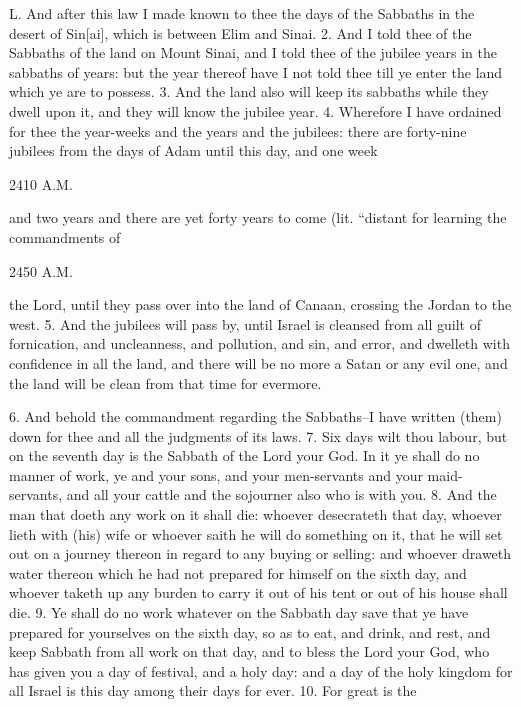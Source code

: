 
L. And after this law I made known to thee the days of the Sabbaths in the desert of Sin[ai], which is between Elim and Sinai.  2. And I told thee of the Sabbaths of the land on Mount Sinai, and I told thee of the jubilee years  in the sabbaths of years: but the year thereof have I not told thee till ye enter the land which ye are to possess. 3. And the land also will keep its sabbaths while they dwell upon it,  and they will know the jubilee year. 4. Wherefore I have ordained for thee the year-weeks  and the years and the jubilees: there are forty-nine jubilees from the days of Adam until this day, and one week

2410 A.M.

and two years and there are yet forty years to come (lit. ``distant for learning the commandments of

2450 A.M.

the Lord, until they pass over into the land of Canaan, crossing the Jordan to the west. 5. And the jubilees will pass by, until Israel is cleansed from all guilt of fornication, and uncleanness, and pollution, and sin, and error, and dwelleth with confidence in all the land, and there will be no more a Satan or any evil one, and the land will be clean from that time for evermore. 

6. And behold the commandment regarding the Sabbaths--I have written (them) down for thee and all the judgments of its laws. 7. Six days wilt thou labour, but on the seventh day is the Sabbath of the Lord your God.  In it ye shall do no manner of work, ye and your sons, and your men-servants and your maid-servants, and all your cattle and the sojourner also who is with you. 8. And the man that doeth any work on it shall die:  whoever desecrateth that day, whoever lieth with (his) wife  or whoever saith he will do something on it, that he will set out on a journey thereon  in regard to any buying or selling:  and whoever draweth water thereon  which he had not prepared for himself on the sixth day, and whoever taketh up any burden to carry it out of his tent  or out of his house shall die. 9. Ye shall do no work whatever on the Sabbath day save that ye have prepared for yourselves on the sixth day, so as to eat, and drink, and rest, and keep Sabbath from all work on that day, and to bless the Lord your God, who has given you a day of festival, and a holy day: and a day of the holy kingdom for all Israel is this day among their days for ever. 10. For great is the


